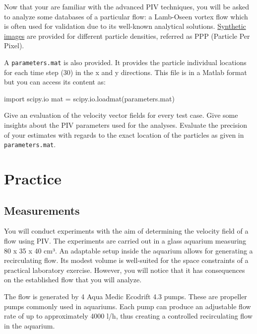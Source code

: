 \documentclass[
  english,
  letterpaper,
  numbers=noendperiod,
  DIV=13]{scrreprt}
\newenvironment{Shaded}{\begin{snugshade}}{\end{snugshade}}
\newcommand{\ImportTok}[1]{\textcolor[rgb]{0.00,0.46,0.62}{#1}}
\newcommand{\NormalTok}[1]{\textcolor[rgb]{0.00,0.23,0.31}{#1}}
\newcommand{\OperatorTok}[1]{\textcolor[rgb]{0.37,0.37,0.37}{#1}}
\newcommand{\StringTok}[1]{\textcolor[rgb]{0.13,0.47,0.30}{#1}}
\begin{document}
Now that your are familiar with the advanced PIV techniques, you will be
asked to analyze some databases of a particular flow: a Lamb-Oseen
vortex flow which is often used for validation due to its well-known
analytical solutions.
\href{https://github.com/jfkrawczynski/um5mee12_jfk/tree/main/images/vortex}{Synthetic
images} are provided for different particle densities, referred as PPP
(Particle Per Pixel).

A \texttt{parameters.mat} is also provided. It provides the particle
individual locations for each time step (30) in the x and y directions.
This file is in a Matlab format but you can access its content as:

\begin{Shaded}
\begin{Highlighting}[]
\ImportTok{import}\NormalTok{ scipy.io}
\NormalTok{mat }\OperatorTok{=}\NormalTok{ scipy.io.loadmat(}\StringTok{\textquotesingle{}parameters.mat\textquotesingle{}}\NormalTok{)}
\end{Highlighting}
\end{Shaded}

Give an evaluation of the velocity vector fields for every test case.
Give some insights about the PIV parameters used for the analyses.
Evaluate the precision of your estimates with regards to the exact
location of the particles as given in \texttt{parameters.mat}.

\part{Practice}

\chapter{Measurements}\label{measurements}

You will conduct experiments with the aim of determining the velocity
field of a flow using PIV. The experiments are carried out in a glass
aquarium measuring 80 x 35 x 40 cm³. An adaptable setup inside the
aquarium allows for generating a recirculating flow. Its modest volume
is well-suited for the space constraints of a practical laboratory
exercise. However, you will notice that it has consequences on the
established flow that you will analyze.

The flow is generated by 4 Aqua Medic Ecodrift 4.3 pumps. These are
propeller pumps commonly used in aquariums. Each pump can produce an
adjustable flow rate of up to approximately 4000 l/h, thus creating a
controlled recirculating flow in the aquarium.
\end{document}
